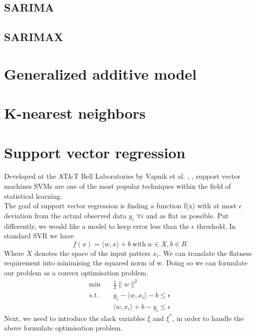 \subsection{SARIMA}
\subsection{SARIMAX}

\section{Generalized additive model}
\section{K-nearest neighbors}

\section{Support vector regression}
Developed at the AT\&T Bell Laboratories by Vapnik et al. \cite{cortes1995support}, \cite{vapnik1997support}, support vector machines SVMs are one of the most popular techniques within the field of statistical learning.
\\
The goal of support vector regression is finding a function f(x) with at most $\epsilon$ deviation from the actual observed data $y_i$ $\forall i$ and as flat as possible. 
Put differently, we would like a model to keep error less than the $\epsilon$ threshold,  
In standard SVR we have
\begin{equation}
    f(x)=\langle w,x \rangle +b \ \textrm{with} \ w \in X, b \in R
\end{equation}
Where $X$ denotes the space of the input patters $x_i$.
We can translate the flatness requirement into minimising the squared norm of w. Doing so we can formulate our problem as a convex optimisation problem.
\begin{equation}
    \begin{aligned}
        \min \quad& \frac{1}{2}\|w\|^2
        \\
        s.t. \quad& y_i-\langle w, x_i\rangle-b\leq \epsilon
        \\
        \quad& \langle w, x_i\rangle +b-y_i\leq \epsilon
    \end{aligned}
\end{equation}
Next, we need to introduce the slack variables $\xi$ and $\xi^*$, in order to handle the above formulate optimisation problem.
